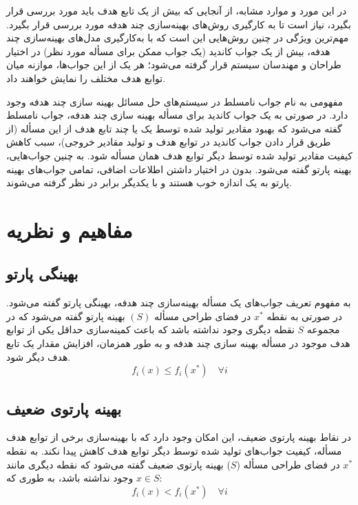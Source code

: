 در این مورد و موارد مشابه، از آنجایی که بیش از یک تابع هدف باید مورد بررسی قرار بگیرد، نیاز است تا به کارگیری روش‌های بهینه‌سازی چند هدفه مورد بررسی قرار بگیرد. مهم‌ترین ویژگی در چنین روش‌هایی این است که با به‌کارگیری مدل‌های بهینه‌سازی چند هدفه، بیش از یک جواب کاندید (یک جواب ممکن برای مسأله مورد نظر) در اختیار طراحان و مهندسان سیستم قرار گرفته می‌شود؛ هر یک از این جواب‌ها، موازنه میان توابع هدف مختلف را نمایش خواهند داد.

مفهومی به نام جواب نامسلط در سیستم‌های حل مسائل بهینه سازی چند هدفه وجود دارد. در صورتی به یک جواب کاندید برای مسأله بهینه سازی چند هدفه، جواب نامسلط گفته می‌شود که بهبود مقادیر تولید شده توسط یک یا چند تابع هدف از این مسأله (از طریق قرار دادن جواب کاندید در توابع هدف و تولید مقادیر خروجی)، سبب کاهش کیفیت مقادیر تولید شده توسط دیگر توابع هدف همان مسأله شود. به چنین جواب‌هایی، بهینه پارتو گفته می‌شود. بدون در اختیار داشتن اطلاعات اضافی، تمامی جواب‌های بهینه پارتو به یک اندازه خوب هستند و با یکدیگر برابر در نظر گرفته می‌شوند.

\section{مفاهیم و نظریه}

\subsection{بهینگی پارتو}


به مفهوم تعریف جواب‌های یک مسأله بهینه‌سازی چند هدفه، بهینگی پارتو  گفته می‌شود. در صورتی به نقطه 
$x^*$
در فضای طراحی مسأله
$(S)$
بهینه پارتو گفته می‌شود که در مجموعه 
$S$
نقطه دیگری وجود نداشته باشد که باعث کمینه‌سازی حداقل یکی از توابع هدف موجود در مسأله بهینه سازی چند هدفه و به طور همزمان، افزایش مقدار یک تابع هدف دیگر شود.
\begin{equation}
	f_i(x) \leq f_i(x^*) \quad \forall i
\end{equation}

\subsection{بهینه پارتوی ضعیف}
در نقاط بهینه پارتوی ضعیف، این امکان وجود دارد که با بهینه‌سازی برخی از توابع هدف مسأله، کیفیت جواب‌های تولید شده توسط دیگر توابع هدف کاهش پیدا نکند.
به نقطه 
$x^*$
در فضای طراحی مسأله ($S$) بهینه پارتوی ضعیف گفته می‌شود که نقطه دیگری مانند 
$x \in S$
وجود نداشته باشد، به طوری که:
\begin{equation}
	f_i(x) < f_i(x^*) \quad \forall i
\end{equation}


